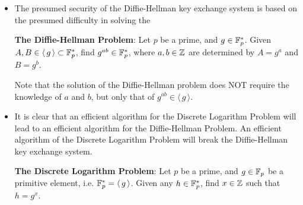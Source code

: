 \begin{itemize}
\item	The presumed security of the Diffie-Hellman key exchange system is based on the presumed difficulty in solving the
		\begin{center}
		\begin{minipage}{0.80\textwidth}
		\textbf{The Diffie-Hellman Problem}: \vskip 0.1cm
		Let $p$ be a prime, and $g\in\mathbb{F}_{p}^{*}$.
		Given $A,B \in \langle\,g\,\rangle \subset \mathbb{F}_{p}^{*}$, find $g^{ab} \in \mathbb{F}_{p}^{*}$,
		where $a, b \in \mathbb{Z}$ are determined by $A = g^{a}$ and $B = g^{b}$.
		\end{minipage}
		\end{center}
		Note that the solution of the Diffie-Hellman problem does NOT require the knowledge of $a$ and $b$, but only
		that of $g^{ab} \in \langle\,g\,\rangle$.
\item	It is clear that an efficient algorithm for the Discrete Logarithm Problem will lead to an efficient algorithm for
		the Diffie-Hellman Problem. An efficient algorithm of the Discrete Logarithm Problem will break the
		Diffie-Hellman key exchange system.
		\begin{center}
		\begin{minipage}{0.80\textwidth}
		\textbf{The Discrete Logarithm Problem}: \vskip 0.1cm
		Let $p$ be a prime, and $g\in\mathbb{F}_{p}$ be a primitive element, i.e. $\mathbb{F}_{p}^{*} = \langle\,g\,\rangle$.
		Given any $h \in \mathbb{F}_{p}^{*}$, find $x \in \mathbb{Z}$ such that $h = g^{x}$.
		\end{minipage}
		\end{center}
\end{itemize}




